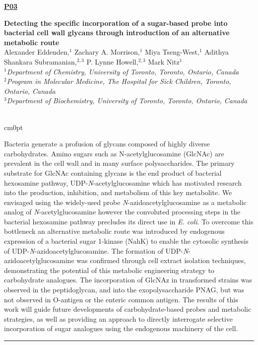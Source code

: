 \documentclass[titlepage,oneside,openany,10pt]{book}
\newenvironment{posterabswfig}[7] %
        {
	\FPeval{\cutw}{clip(16.7-#6)}
	\FPeval{\cutl}{round(#7/0.35+1,3)}
	\begin{flushright}
                \underline{\textbf{#4}}
        \end{flushright}
        \textbf{#1}\\%
        #2\\%
        \textit{#3}\\\\%
        \def\windowpagestuff{\centering
                \texttt{[image: \#5]}
	}
        \opencutright
        \begin{cutout}{0}{\cutw cm}{0pt}{\RoundingUpFunction{\cutl}}
        \noindent
	}
	{
	\end{cutout}
	\noindent\rule{15cm}{0.5pt}%
        }
\begin{document}
\begin{posterabswfig}
	{Detecting the specific incorporation of a sugar-based probe into bacterial cell wall glycans through introduction of an alternative metabolic route}
	{Alexander Eddenden,$^{1}$ Zachary A. Morrison,$^{1}$ Miya Tseng-West,$^{1}$ Adithya Shankara Subramanian,$^{2,3}$ P. Lynne Howell,$^{2,3}$ Mark Nitz$^{1}$}
	{
	$^1$Department of Chemistry, University of Toronto, Toronto, Ontario, Canada\\
	$^2$Program in Molecular Medicine, The Hospital for Sick Children, Toronto, Ontario, Canada\\
	$^3$Department of Biochemistry, University of Toronto, Toronto, Ontario, Canada
	}
	{P03}
	{abstract_figures/Eddenden_Alexander_Poster.jpg}
	{10.0}
	{10.0}
	Bacteria generate a profusion of glycans composed of highly diverse carbohydrates. Amino sugars such as N-acetylglucosamine (GlcNAc) are prevalent in the cell wall and in many surface polysaccharides. The primary substrate for GlcNAc containing glycans is the end product of bacterial hexosamine pathway, UDP-\emph{N}-acetylglucosamine which has motivated research into the production, inhibition, and metabolism of this key metabolite. We envisaged using the widely-used probe \emph{N}-azidoacetylglucosamine as a metabolic analog of \emph{N}-acetylglucosamine however the convoluted processing steps in the bacterial hexosamine pathway precludes its direct use in \emph{E. coli}. To overcome this bottleneck an alternative metabolic route was introduced by endogenous expression of a bacterial sugar 1-kinase (NahK) to enable the cytosolic synthesis of UDP-\emph{N}-azidoacetylglucosamine. The formation of UDP-\emph{N}-azidoacetylglucosamine was confirmed through cell extract isolation techniques, demonstrating the potential of this metabolic engineering strategy to carbohydrate analogues. The incorporation of GlcNAz in transformed strains was observed in the peptidoglycan, and into the exopolysaccharide PNAG, but was not observed in O-antigen or the enteric common antigen. The results of this work will guide future developments of carbohydrate-based probes and metabolic strategies, as well as providing an approach to directly interrogate selective incorporation of sugar analogues using the endogenous machinery of the cell.
	\label{EddendenA}
	\end{posterabswfig}
\end{document}

